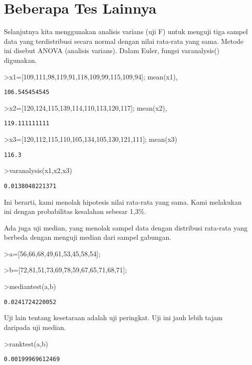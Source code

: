 \documentclass[
]{book}
\begin{document}
\chapter{Beberapa Tes Lainnya}\label{beberapa-tes-lainnya}

Selanjutnya kita menggunakan analisis varians (uji F) untuk menguji tiga sampel data yang terdistribusi secara normal dengan nilai rata-rata yang sama. Metode ini disebut ANOVA (analisis varians). Dalam Euler, fungsi varanalysis() digunakan.

\textgreater x1={[}109,111,98,119,91,118,109,99,115,109,94{]}; mean(x1),

\begin{verbatim}
106.545454545
\end{verbatim}

\textgreater x2={[}120,124,115,139,114,110,113,120,117{]}; mean(x2),

\begin{verbatim}
119.111111111
\end{verbatim}

\textgreater x3={[}120,112,115,110,105,134,105,130,121,111{]}; mean(x3)

\begin{verbatim}
116.3
\end{verbatim}

\textgreater varanalysis(x1,x2,x3)

\begin{verbatim}
0.0138048221371
\end{verbatim}

Ini berarti, kami menolak hipotesis nilai rata-rata yang sama. Kami melakukan ini dengan probabilitas kesalahan sebesar 1,3\%.

Ada juga uji median, yang menolak sampel data dengan distribusi rata-rata yang berbeda dengan menguji median dari sampel gabungan.

\textgreater a={[}56,66,68,49,61,53,45,58,54{]};

\textgreater b={[}72,81,51,73,69,78,59,67,65,71,68,71{]};

\textgreater mediantest(a,b)

\begin{verbatim}
0.0241724220052
\end{verbatim}

Uji lain tentang kesetaraan adalah uji peringkat. Uji ini jauh lebih tajam daripada uji median.

\textgreater ranktest(a,b)

\begin{verbatim}
0.00199969612469
\end{verbatim}
\end{document}
